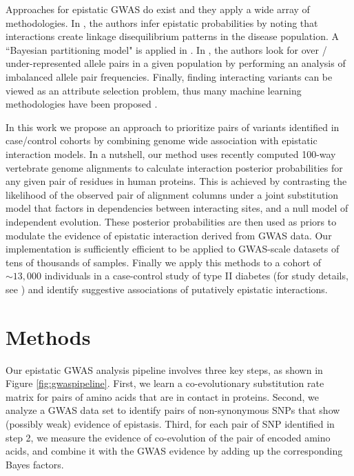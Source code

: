 Approaches for epistatic GWAS do exist and they apply a wide array of methodologies. In \cite{zhao2006test}, the authors infer epistatic probabilities by noting that interactions create linkage disequilibrium patterns in the disease population. A ``Bayesian partitioning model" is applied in \cite{zhang2007bayesian}. In \cite{ackermann2012systematic}, the authors look for over / under-represented allele pairs in a given population by performing an analysis of imbalanced allele pair frequencies. Finally, finding interacting variants can be viewed as an attribute selection problem, thus many machine learning methodologies have been proposed \cite{mckinney2006machine}.

In this work we propose an approach to prioritize pairs of variants identified in case/control cohorts by combining genome wide association with epistatic interaction models. In a nutshell, our method uses recently computed 100-way vertebrate genome alignments \cite{blanchette2004aligning} to calculate interaction posterior probabilities for any given pair of residues in human proteins. This is achieved by contrasting the likelihood of the observed pair of alignment columns under a joint substitution model that factors in dependencies between interacting sites, and a null model of independent evolution.  These posterior probabilities are then used as priors to modulate the evidence of epistatic interaction derived from GWAS data. Our implementation is sufficiently efficient to be applied to GWAS-scale datasets of tens of thousands of samples. Finally we apply this methods to a cohort of $\sim 13,000$ individuals in a case-control study of type II diabetes (for study details, see \cite{mccarthy2015T2D}) and identify suggestive associations of putatively epistatic interactions.

\section{Methods \label{sec:gwasMeth}}

Our epistatic GWAS analysis pipeline involves three key steps, as shown in Figure \ref{fig:gwaspipeline}. First, we learn a co-evolutionary substitution rate matrix for pairs of amino acids that are in contact in proteins. Second, we analyze a GWAS data set to identify pairs of non-synonymous SNPs that show (possibly weak) evidence of epistasis. Third, for each pair of SNP identified in step 2, we measure the evidence of co-evolution of the pair of encoded amino acids, and combine it with the GWAS evidence by adding up the corresponding Bayes factors.

